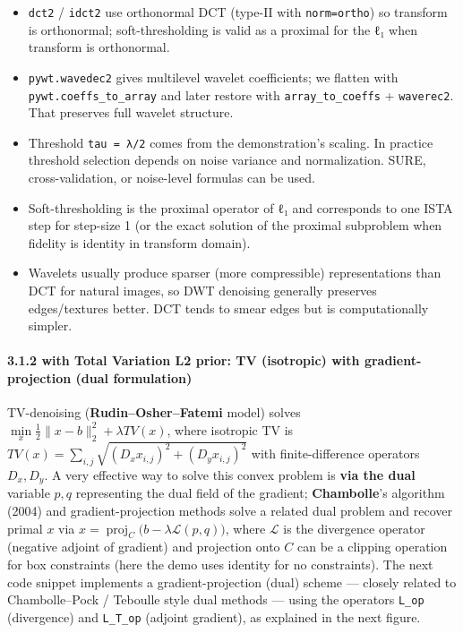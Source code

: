 \documentclass[11pt]{article}
\providecommand{\tightlist}{%
      \setlength{\itemsep}{0pt}\setlength{\parskip}{0pt}}
\begin{document}
\begin{itemize}
\tightlist
\item
  \texttt{dct2} / \texttt{idct2} use orthonormal DCT (type-II with
  \texttt{norm=\textquotesingle{}ortho\textquotesingle{}}) so transform
  is orthonormal; soft-thresholding is valid as a proximal for the ℓ₁
  when transform is orthonormal.
\item
  \texttt{pywt.wavedec2} gives multilevel wavelet coefficients; we
  flatten with \texttt{pywt.coeffs\_to\_array} and later restore with
  \texttt{array\_to\_coeffs} + \texttt{waverec2}. That preserves full
  wavelet structure.
\item
  Threshold \texttt{tau\ =\ λ/2} comes from the demonstration's scaling.
  In practice threshold selection depends on noise variance and
  normalization. SURE, cross-validation, or noise-level formulas can be
  used.
\item
  Soft-thresholding is the proximal operator of ℓ₁ and corresponds to
  one ISTA step for step-size 1 (or the exact solution of the proximal
  subproblem when fidelity is identity in transform domain).
\item
  Wavelets usually produce sparser (more compressible) representations
  than DCT for natural images, so DWT denoising generally preserves
  edges/textures better. DCT tends to smear edges but is computationally
  simpler.
\end{itemize}

\hypertarget{with-total-variation-l2-prior-tv-isotropic-with-gradient-projection-dual-formulation}{%
\paragraph{\texorpdfstring{\textbf{3.1.2 with Total Variation L2 prior}:
TV (isotropic) with gradient-projection (dual
formulation)}{3.1.2 with Total Variation L2 prior: TV (isotropic) with gradient-projection (dual formulation)}}\label{with-total-variation-l2-prior-tv-isotropic-with-gradient-projection-dual-formulation}}

TV-denoising (\textbf{Rudin--Osher--Fatemi} model) solves
\(\underset{x}{\min} \frac12\|x - b\|_2^2 + \lambda TV(x)\), where
isotropic TV is
\(TV(x) = \sum\limits_{i,j} \sqrt{(D_x x_{i,j})^2 + (D_y x_{i,j})^2}\)
with finite-difference operators \(D_x, D_y\). A very effective way to
solve this convex problem is \textbf{via the dual} variable \(p,q\)
representing the dual field of the gradient; \textbf{Chambolle}'s
algorithm (2004) and gradient-projection methods solve a related dual
problem and recover primal \(x\) via
\(x = \operatorname{proj}_{C}\big( b - \lambda \mathcal{L}(p,q) \big)\),
where \(\mathcal{L}\) is the divergence operator (negative adjoint of
gradient) and projection onto \(C\) can be a clipping operation for box
constraints (here the demo uses identity for no constraints). The next
code snippet implements a gradient-projection (dual) scheme --- closely
related to Chambolle--Pock / Teboulle style dual methods --- using the
operators \texttt{L\_op} (divergence) and \texttt{L\_T\_op} (adjoint
gradient), as explained in the next figure.
\end{document}
